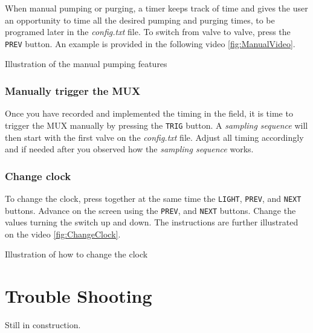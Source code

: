 \documentclass[]{book}
\begin{document}
When manual pumping or purging, a timer keeps track of time and gives the user an opportunity to time all the desired pumping and purging times, to be programed later in the \emph{config.txt} file. To switch from valve to valve, press the \texttt{PREV} button. An example is provided in the following video \ref{fig:ManualVideo}.

\label{fig:ManualVideo}Illustration of the manual pumping features

\hypertarget{manually-trigger-the-mux}{%
\subsection{Manually trigger the MUX}\label{manually-trigger-the-mux}}

Once you have recorded and implemented the timing in the field, it is time to trigger the MUX manually by pressing the \texttt{TRIG} button. A \emph{sampling sequence} will then start with the first valve on the \emph{config.txt} file. Adjust all timing accordingly and if needed after you observed how the \emph{sampling sequence} works.

\hypertarget{change-clock}{%
\subsection{Change clock}\label{change-clock}}

To change the clock, press together at the same time the \texttt{LIGHT}, \texttt{PREV}, and \texttt{NEXT} buttons. Advance on the screen using the \texttt{PREV}, and \texttt{NEXT} buttons. Change the values turning the switch up and down. The instructions are further illustrated on the video \ref{fig:ChangeClock}.

\label{fig:ChangeClock}Illustration of how to change the clock

\hypertarget{trouble-shooting}{%
\chapter{Trouble Shooting}\label{trouble-shooting}}

Still in construction.


\end{document}
